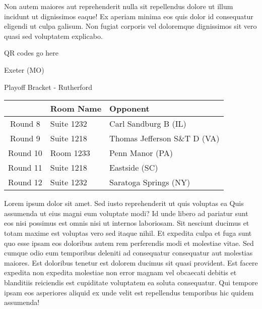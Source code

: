 \documentclass{article}%
\begin{document}
\newline%
Non autem maiores aut reprehenderit nulla sit repellendus dolore ut illum incidunt ut dignissimos eaque! Ex aperiam minima eos quis dolor id consequatur eligendi ut culpa galisum. Non fugiat corporis vel doloremque dignissimos sit vero quasi sed voluptatem explicabo.\newline%
\newline%
%
\vspace*{30pt}%
\begin{center}%
\begin{Huge}%
QR codes go here%
\end{Huge}%
\end{center}%
\newpage%
\begin{center}%
\begin{Huge}%
Exeter (MO)%
\end{Huge}%
\vspace*{8pt}%
\linebreak%
\begin{Large}%
Playoff Bracket {-} Rutherford%
\end{Large}%
\end{center}%
\begin{tabularx}{\textwidth}{|c|Y|Y|}%
\hline%
&Room Name&Opponent\\%
\hline%
Round 8&Suite 1232&Carl Sandburg B (IL)\\%
Round 9&Suite 1218&Thomas Jefferson S\&T D (VA)\\%
Round 10&Room 1233&Penn Manor (PA)\\%
Round 11&Suite 1218&Eastside (SC)\\%
Round 12&Suite 1232&Saratoga Springs (NY)\\%
\hline%
\end{tabularx}%
\vspace*{8pt}%
\linebreak%
\newline%
\newline%
Lorem ipsum dolor sit amet. Sed iusto reprehenderit ut quis voluptas ea Quis assumenda ut eius magni eum voluptate modi? Id unde libero ad pariatur sunt eos nisi possimus est omnis nisi ut internos laboriosam. Sit nesciunt ducimus et totam maxime est voluptas vero sed itaque nihil. Et expedita culpa et fuga sunt quo esse ipsam eos doloribus autem rem perferendis modi et molestiae vitae.\newline%
\newline%
Sed cumque odio eum temporibus deleniti ad consequatur consequatur aut molestias maiores. Est doloribus tenetur est dolorem ducimus sit quasi provident. Est facere expedita non expedita molestiae non error magnam vel obcaecati debitis et blanditiis reiciendis est cupiditate voluptatem ea soluta consequatur. Qui tempore ipsam eos asperiores aliquid ex unde velit est repellendus temporibus hic quidem assumenda!\newline%
\end{document}
